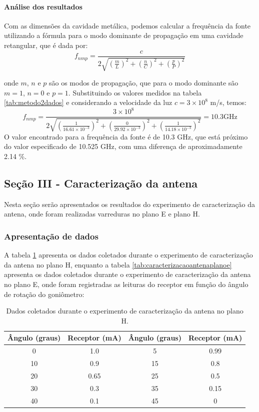 \documentclass[12pt]{article}
\begin{document}
\paragraph{Análise dos resultados}
Com as dimensões da cavidade metálica, podemos calcular a
frequência da fonte utilizando a fórmula para o modo dominante de
propagação em uma cavidade retangular, que é dada por:
\begin{equation}
  f_{nmp} = \frac{c}{2\sqrt{\left(\frac{m}{L}\right)^2 +
  \left(\frac{n}{C}\right)^2 + \left(\frac{p}{P}\right)^2}}
\end{equation}

onde $m$, $n$ e $p$ são os modos de propagação, que para o modo
dominante são $m = 1$, $n = 0$ e $p = 1$. Substituindo os valores
medidos na tabela \ref{tab:metodo2dados} e considerando a velocidade
da luz $c = 3 \times 10^8$ m/s, temos:
\begin{equation}
  f_{nmp} = \frac{3 \times 10^8}{2\sqrt{\left(\frac{1}{16.61\times
      10^{-3}}\right)^2 + \left(\frac{0}{29.92 \times 10^{-3}}\right)^2 +
  \left(\frac{1}{14.18 \times 10^{-3}}\right)^2}} = 10.3 \text{GHz}
\end{equation}
O valor encontrado para a frequência da fonte é de 10.3 GHz, que
está próximo do valor especificado de 10.525 GHz, com uma diferença
de aproximadamente
2.14 \%.

\subsection{Seção III - Caracterização da antena}
Nesta seção serão apresentados os resultados do experimento de
caracterização da antena, onde foram realizadas varreduras no plano E e plano H.
\subsubsection{Apresentação de dados}
A tabela \ref{tab:caracterizacaoantenaplanoh} apresenta os dados coletados
durante o experimento de caracterização da antena no plano H, enquanto a tabela
\ref{tab:caracterizacaoantenaplanoe} apresenta os dados coletados
durante o experimento de caracterização da antena no plano E,
onde foram registradas as leituras do receptor em função do ângulo de
rotação do goniômetro:

\begin{table}[H]
  \centering
  \begin{tabular}{|c|c|c|c|}
    \hline
    Ângulo (graus) & Receptor (mA) & Ângulo (graus) & Receptor (mA)\\
    \hline
    0 & 1.0 & 5 & 0.99 \\
    10 & 0.9 & 15 & 0.8 \\
    20 & 0.65 & 25 & 0.5 \\
    30 & 0.3 & 35 & 0.15 \\
    40 & 0.1 & 45 & 0 \\
    \hline
  \end{tabular}
  \caption{Dados coletados durante o experimento de caracterização da
  antena no plano H.}
  \label{tab:caracterizacaoantenaplanoh}
\end{table}
\end{document}
